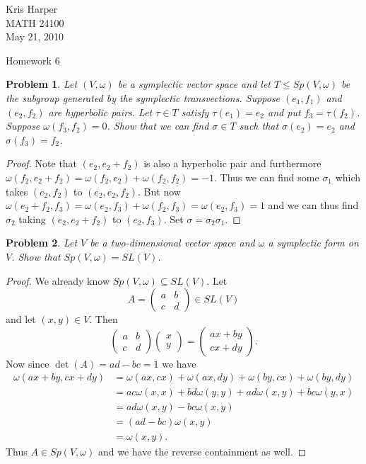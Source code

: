 \documentclass{article}
\newtheorem{problem}{Problem}
\begin{document}
\begin{flushright}
Kris Harper\\

MATH 24100\\

May 21, 2010
\end{flushright}

\begin{center}
Homework 6
\end{center}

\begin{problem}
Let $(V, \omega)$ be a symplectic vector space and let $T \leq Sp(V, \omega)$ be the subgroup generated by the symplectic transvections. Suppose $(e_1,f_1)$ and $(e_2,f_2)$ are hyperbolic pairs. Let $\tau \in T$ satisfy $\tau(e_1) = e_2$ and put $f_3 = \tau(f_2)$. Suppose $\omega(f_3,f_2) = 0$. Show that we can find $\sigma \in T$ such that $\sigma(e_2) = e_2$ and $\sigma(f_3) = f_2$.
\end{problem}
\begin{proof}
Note that $(e_2, e_2+f_2)$ is also a hyperbolic pair and furthermore $\omega(f_2,e_2+f_2) = \omega(f_2,e_2) + \omega(f_2,f_2) = -1$. Thus we can find some $\sigma_1$ which takes $(e_2,f_2)$ to $(e_2,e_2,f_2)$. But now $\omega(e_2+f_2,f_3) = \omega(e_2,f_3) + \omega(f_2,f_3) = \omega(e_2,f_3) = 1$ and we can thus find $\sigma_2$ taking $(e_2,e_2+f_2)$ to $(e_2,f_3)$. Set $\sigma = \sigma_2\sigma_1$.
\end{proof}

\begin{problem}
Let $V$ be a two-dimensional vector space and $\omega$ a symplectic form on $V$. Show that $Sp(V,\omega) = SL(V)$.
\end{problem}
\begin{proof}
We already know $Sp(V,\omega) \subseteq SL(V)$. Let
\[
A =
\left (
\begin{array}{cc}
a & b\\
c & d
\end{array}
\right ) \in SL(V)
\]
and let $(x,y) \in V$. Then
\[
\left (
\begin{array}{cc}
a & b\\
c & d
\end{array}
\right )
\left (
\begin{array}{c}
x\\
y
\end{array}
\right )
=
\left (
\begin{array}{c}
ax + by\\
cx + dy
\end{array}
\right ).
\]
Now since $\det(A) = ad-bc = 1$ we have
\begin{align*}
\omega(ax + by, cx + dy)
&= \omega(ax,cx) + \omega(ax,dy) + \omega(by,cx) + \omega(by,dy)\\
&= ac\omega(x,x) + bd\omega(y,y) + ad\omega(x,y) + bc\omega(y,x)\\
&= ad\omega(x,y) - bc\omega(x,y)\\
&= (ad-bc)\omega(x,y)\\
&= \omega(x,y).
\end{align*}
Thus $A \in Sp(V,\omega)$ and we have the reverse containment as well.
\end{proof}
\end{document}
